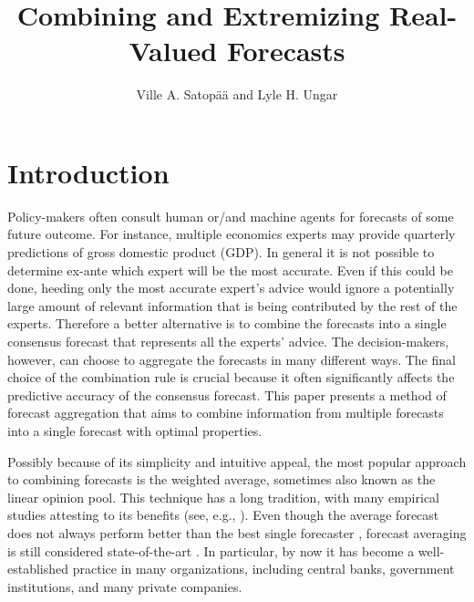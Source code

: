 \documentclass[11pt]{article}
\title{Combining and Extremizing Real-Valued Forecasts}
\author{
Ville A. Satop\"a\"a and Lyle H. Ungar}
\date{}
\theoremstyle{definition}
\theoremstyle{definition}
\begin{document}
\maketitle

\begin{abstract}


\end{abstract}


\section{Introduction} \label{introduction}

Policy-makers often consult human or/and machine agents for forecasts
of some future outcome. For instance, multiple economics experts may
provide quarterly predictions of gross domestic product (GDP). In general it is not possible to determine ex-ante which expert will be the most accurate. Even if this could be done, heeding only the most accurate expert's advice would ignore a potentially large amount of relevant information that is being contributed by the rest of the experts. Therefore a better alternative is to combine the
forecasts into a single consensus forecast that represents all the experts' advice. 
The decision-makers, however, can choose to aggregate the forecasts in many different ways. The final choice of the combination rule is crucial because it often
significantly affects the predictive accuracy of the consensus
forecast. This paper presents a method of forecast
aggregation that aims to combine information from multiple forecasts
into a single forecast with optimal properties.

Possibly because of its simplicity and intuitive appeal, the most
popular approach to combining forecasts is the weighted average, sometimes also known as the linear opinion pool. 
This technique has a long tradition, with many empirical studies attesting to its benefits (see, e.g., \citealt{bates1969combination, clemen1989combining, armstrong2}). 
Even though the average forecast does not always perform better than the best single forecaster \citep{hibon2005combine},
forecast averaging is still considered state-of-the-art \citep{elliott2013handbook}.
In particular, by now it has become  a well-established practice in many organizations, including central banks, government institutions, and many private companies.
\end{document}
